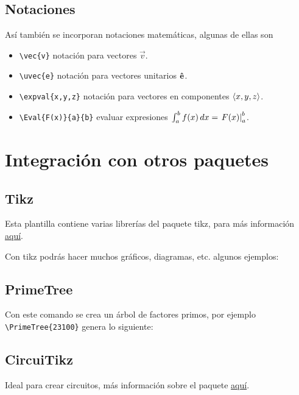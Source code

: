 \newpage
\subsection{Notaciones}
Así también se incorporan notaciones matemáticas, algunas de ellas son
\begin{itemize}
    \item \verb|\vec{v}| notación para vectores $\vec{v}$.
    \item \verb|\uvec{e}| notación para vectores unitarios $\uvec{e}$.
    \item \verb|\expval{x,y,z}| notación para vectores en componentes $\expval{x,y,z}$.
    \item \verb|\Eval{F(x)}{a}{b}| evaluar expresiones $\int_a^b f(x)\, dx=\left.F(x)\right\rvert_{a}^{b}$.
\end{itemize}


\section{Integración con otros paquetes}

\subsection{Tikz}
Esta plantilla contiene varias librerías del paquete tikz, para más información \href{https://www.bu.edu/math/files/2013/08/tikzpgfmanual.pdf}{aquí}.

\newp Con tikz podrás hacer muchos gráficos, diagramas, etc. algunos ejemplos:

 






\subsection{PrimeTree}
Con este comando se crea un árbol de factores primos, por ejemplo \verb|\PrimeTree{23100}| genera lo siguiente:       


\subsection{CircuiTikz}
Ideal para crear circuitos, más información sobre el paquete \href{https://texdoc.org/serve/circuitikz/0}{aquí}.















